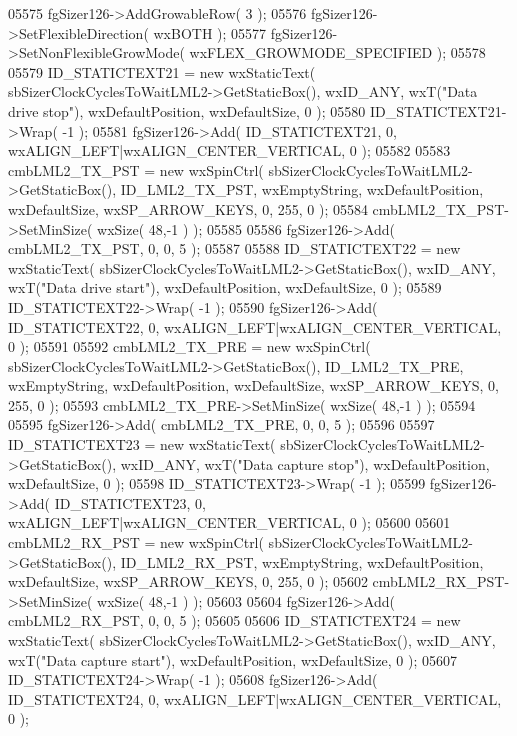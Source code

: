\begin{DoxyCode}
05575     fgSizer126->AddGrowableRow( 3 );
05576     fgSizer126->SetFlexibleDirection( wxBOTH );
05577     fgSizer126->SetNonFlexibleGrowMode( wxFLEX\_GROWMODE\_SPECIFIED );
05578     
05579     ID_STATICTEXT21 = \textcolor{keyword}{new} wxStaticText( sbSizerClockCyclesToWaitLML2->GetStaticBox(), wxID\_ANY, wxT(\textcolor{stringliteral}{"Data
       drive stop"}), wxDefaultPosition, wxDefaultSize, 0 );
05580     ID_STATICTEXT21->Wrap( -1 );
05581     fgSizer126->Add( ID_STATICTEXT21, 0, wxALIGN\_LEFT|wxALIGN\_CENTER\_VERTICAL, 0 );
05582     
05583     cmbLML2_TX_PST = \textcolor{keyword}{new} wxSpinCtrl( sbSizerClockCyclesToWaitLML2->GetStaticBox(), 
      ID_LML2_TX_PST, wxEmptyString, wxDefaultPosition, wxDefaultSize, wxSP\_ARROW\_KEYS, 0, 255, 0 );
05584     cmbLML2_TX_PST->SetMinSize( wxSize( 48,-1 ) );
05585     
05586     fgSizer126->Add( cmbLML2_TX_PST, 0, 0, 5 );
05587     
05588     ID_STATICTEXT22 = \textcolor{keyword}{new} wxStaticText( sbSizerClockCyclesToWaitLML2->GetStaticBox(), wxID\_ANY, wxT(\textcolor{stringliteral}{"Data
       drive start"}), wxDefaultPosition, wxDefaultSize, 0 );
05589     ID_STATICTEXT22->Wrap( -1 );
05590     fgSizer126->Add( ID_STATICTEXT22, 0, wxALIGN\_LEFT|wxALIGN\_CENTER\_VERTICAL, 0 );
05591     
05592     cmbLML2_TX_PRE = \textcolor{keyword}{new} wxSpinCtrl( sbSizerClockCyclesToWaitLML2->GetStaticBox(), 
      ID_LML2_TX_PRE, wxEmptyString, wxDefaultPosition, wxDefaultSize, wxSP\_ARROW\_KEYS, 0, 255, 0 );
05593     cmbLML2_TX_PRE->SetMinSize( wxSize( 48,-1 ) );
05594     
05595     fgSizer126->Add( cmbLML2_TX_PRE, 0, 0, 5 );
05596     
05597     ID_STATICTEXT23 = \textcolor{keyword}{new} wxStaticText( sbSizerClockCyclesToWaitLML2->GetStaticBox(), wxID\_ANY, wxT(\textcolor{stringliteral}{"Data
       capture stop"}), wxDefaultPosition, wxDefaultSize, 0 );
05598     ID_STATICTEXT23->Wrap( -1 );
05599     fgSizer126->Add( ID_STATICTEXT23, 0, wxALIGN\_LEFT|wxALIGN\_CENTER\_VERTICAL, 0 );
05600     
05601     cmbLML2_RX_PST = \textcolor{keyword}{new} wxSpinCtrl( sbSizerClockCyclesToWaitLML2->GetStaticBox(), 
      ID_LML2_RX_PST, wxEmptyString, wxDefaultPosition, wxDefaultSize, wxSP\_ARROW\_KEYS, 0, 255, 0 );
05602     cmbLML2_RX_PST->SetMinSize( wxSize( 48,-1 ) );
05603     
05604     fgSizer126->Add( cmbLML2_RX_PST, 0, 0, 5 );
05605     
05606     ID_STATICTEXT24 = \textcolor{keyword}{new} wxStaticText( sbSizerClockCyclesToWaitLML2->GetStaticBox(), wxID\_ANY, wxT(\textcolor{stringliteral}{"Data
       capture start"}), wxDefaultPosition, wxDefaultSize, 0 );
05607     ID_STATICTEXT24->Wrap( -1 );
05608     fgSizer126->Add( ID_STATICTEXT24, 0, wxALIGN\_LEFT|wxALIGN\_CENTER\_VERTICAL, 0 );

\end{DoxyCode}
